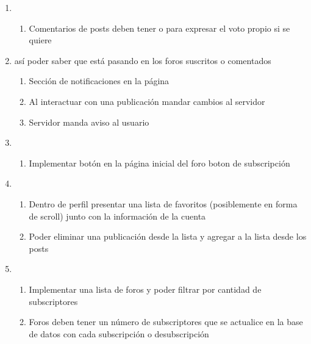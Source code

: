 \documentclass[12pt, letterpaper, notitlepage]{article}
\begin{document}
\begin{enumerate}
   \item {}
       	\begin{enumerate}
			\item Comentarios de posts deben tener  o  para expresar el voto propio si se quiere
		\end{enumerate}

	\item {}		
		{así poder saber que está pasando en los foros suscritos o comentados}
		\begin{enumerate}
			\item Sección de notificaciones en la página
			\item Al interactuar con una publicación mandar cambios al servidor
			\item Servidor manda aviso al usuario
		\end{enumerate}

    \item {}
    	\begin{enumerate}
			\item Implementar botón en la página inicial del foro boton de subscripción
		\end{enumerate}

	\item {}
    	\begin{enumerate}
			\item Dentro de perfil presentar una lista de favoritos (posiblemente en forma de scroll) junto con la información de la cuenta
			\item Poder eliminar una publicación desde la lista y agregar a la lista desde los posts
		\end{enumerate}

    
    \item {}
    	\begin{enumerate}
			\item Implementar una lista de foros y poder filtrar por cantidad de subscriptores
			\item Foros deben tener un número de subscriptores que se actualice en la base de datos con cada subscripción o desubscripción
		\end{enumerate}


\end{enumerate}
\end{document}
